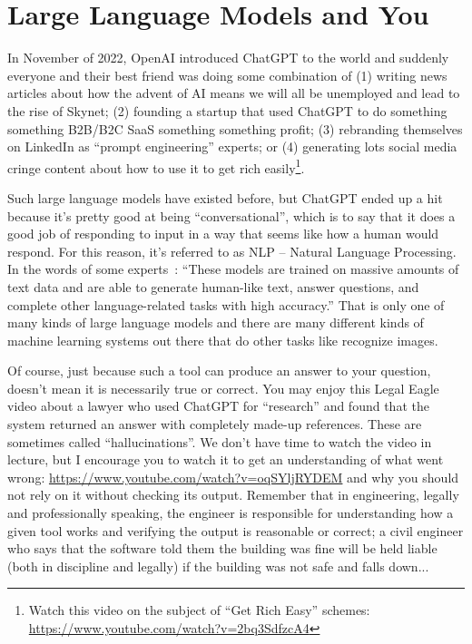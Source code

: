 




\section*{Large Language Models and You}

In November of 2022, OpenAI introduced ChatGPT to the world and suddenly everyone and their best friend was doing some combination of (1) writing news articles about how the advent of AI means we will all be unemployed and lead to the rise of Skynet; (2) founding a startup that used ChatGPT to do something something B2B/B2C SaaS something something profit; (3) rebranding themselves on LinkedIn as ``prompt engineering'' experts; or (4) generating lots social media cringe content about how to use it to get rich easily\footnote{Watch this video on the subject of ``Get Rich Easy'' schemes: \url{https://www.youtube.com/watch?v=2bq3SdfzcA4}}.

Such large language models have existed before, but ChatGPT ended up a hit because it's pretty good at being ``conversational'', which is to say that it does a good job of responding to input in a way that seems like how a human would respond. For this reason, it's referred to as NLP -- Natural Language Processing. In the words of some experts~\cite{gptforgood}: ``These models are trained on massive amounts of text data and are able to generate human-like text, answer questions, and complete other language-related tasks with high accuracy.'' That is only one of many kinds of large language models and there are many different kinds of machine learning systems out there that do other tasks like recognize images.

Of course, just because such a tool can produce an answer to your question, doesn't mean it is necessarily true or correct. You may enjoy this Legal Eagle video about a lawyer who used ChatGPT for ``research'' and found that the system returned an answer with completely made-up references. These are sometimes called ``hallucinations''. We don't have time to watch the video in lecture, but I encourage you to watch it to get an understanding of what went wrong: \url{https://www.youtube.com/watch?v=oqSYljRYDEM} and why you should not rely on it without checking its output. Remember that in engineering, legally and professionally speaking, the engineer is responsible for understanding how a given tool works and verifying the output is reasonable or correct; a civil engineer who says that the software told them the building was fine will be held liable (both in discipline and legally) if the building was not safe and falls down...

